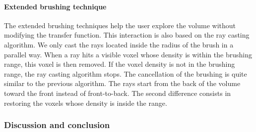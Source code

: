 \paragraph{Extended brushing technique}

The extended brushing techniques help the user explore the volume without modifying the transfer function. This interaction is also based on the ray casting algorithm. We only cast the rays located inside the radius of the brush in a parallel way.
When a ray hits a visible voxel whose density is within the brushing range, this voxel is then removed. If the voxel density is not in the brushing range, the ray casting algorithm stops.
The cancellation of the brushing is quite similar to the previous algorithm. The rays start from the back of the volume toward the front instead of front-to-back. The second difference consists in restoring the voxels whose density is inside the range.

\subsubsection{Discussion and conclusion}

